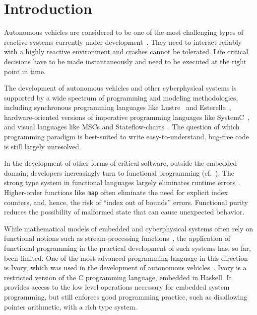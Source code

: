 \section{Introduction}

Autonomous vehicles are considered to be one of the most challenging
types of reactive systems currently under development~\cite{AlurMT16,
  WongpiromsarnKF11, RamanDSMS15}. They need to interact reliably with
a highly reactive environment and crashes cannot be tolerated.  Life
critical decisions have to be made instantaneously and need to be
executed at the right point in time.

The development of autonomous vehicles and other cyberphysical systems
is supported by a wide spectrum of
programming and modeling methodologies, 
including synchronous programming languages like Lustre~\cite{conf/popl/CaspiPHP87} 
and Esterelle~\cite{conf/concur/BerryC84},
hardware-oriented versions of imperative programming languages like
SystemC~\cite{open2006ieee}, and visual languages like MSCs and Stateflow-charts~\cite{harel2003message,journals/scp/Harel87}.
The question of which programming paradigm is best-suited to write
easy-to-understand, bug-free code is still largely unresolved.

In the development of other forms of critical software, outside the
embedded domain, developers increasingly turn to functional
programming (cf.~\cite{frankau2009commercial}).  The strong type system in functional
languages largely eliminates runtime errors~\cite{cardelli1996type}.
Higher-order functions like \texttt{map} often eliminate the need for
explicit index counters, and, hence, the risk of ``index out of
bounds'' errors.  Functional purity reduces the possibility of
malformed state that can cause unexpected behavior.

While mathematical models of embedded and cyberphysical systems often
rely on functional notions such as stream-processing
functions~\cite{series/mcs/BroyS01,conf/csdm/Broy12}, the
application of functional programming in the practical development of
such systems has, so far, been limited. One of the most advanced
programming language in this direction is Ivory, which was used in the
development of autonomous vehicles~\cite{pike2014}.  Ivory is a
restricted version of the C programming language, embedded in Haskell.
It provides access to the low level operations necessary for embedded
system programming, but still enforces good programming practice, such
as disallowing pointer arithmetic, with a rich type system.

